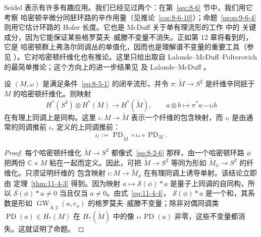 Seidel 表示有许多有趣应用。我们已经见过两个：在第~\ref{sec:8-6} 节中，我们用它考察
哈密顿辛微分同胚环路的辛作用量（见推论~\ref{cor:8-6-10}）；命题~\ref{prop:9-6-4}
则用它估计环路的 Hofer 长度。它也是 McDuff 关于单有理流形的工作  中的
关键成分，因为它能保证某些格罗莫夫--威滕不变量不消失。正如第 12 章将看到的，它是
哈密顿群上弗洛尔同调丛的单值化，因而也是理解谱不变量的重要工具（参见
）。它对哈密顿纤维化也有推论。这里只给出取自
Lalonde--McDuff--Polterovich  的最简单推论；这个方向上的进一步结果见
 及 Lalonde--McDuff 。

\begin{proposition}\label{prop:11-4-5}
设 $(M,\omega)$ 是满足条件~\eqref{eq:8-5-1} 的闭辛流形，并令
$\pi:\widetilde M\to S^2$ 是纤维辛同胚于 $M$ 的哈密顿纤维化。则映射
\[
  H^*(S^2)\otimes H^*(M)\longrightarrow H^*(\widetilde M),
  \qquad a\otimes b\longmapsto\pi^*a\smile\iota_!b
\]
在有理上同调上是同构。这里 $\iota:M\to\widetilde M$ 表示一个纤维的包含映射，而
$\iota_!$ 是由通常的同调推前 $\iota_*$ 定义的上同调推前：
\[
  \iota_!:=\operatorname{PD}_{\widetilde M}\circ\iota_*\circ\operatorname{PD}_M.
\]
\end{proposition}

\begin{proof}
每个哈密顿纤维化 $\widetilde M\to S^2$ 都像式~\eqref{eq:8-2-6} 那样，由一个哈密顿环路
$\phi$ 把两份 $\mathbb C\times M$ 粘在一起而定义。因此，可把
$\widetilde M\to S^2$ 等同为形如 $\widetilde M_\phi\to S^2$ 的纤维化。只须证明纤维的
包含映射 $\iota:M\to\widetilde M_\phi$ 在有理同调上诱导单射。该结论立即由
定理~\ref{thm:11-4-3} 得到。因为映射
$a\mapsto\mathcal S(\phi)*a$ 是量子上同调的自同构，所以
$\mathcal S(\phi)*a\ne0$ 当且仅当 $a\ne0$。由式~\eqref{eq:11-4-4}，
$\mathcal S(\phi)*a$ 是一个和，其系数是形如
$\operatorname{GW}_{\widetilde A,2}(a,e_\nu)$ 的格罗莫夫--威滕不变量；除非对偶同调类
$\operatorname{PD}(a)\in H_*(M)$ 在 $H_*(\widetilde M)$ 中的像
$\iota_*\operatorname{PD}(a)$ 非零，这些不变量都消失。这就证明了命题。
\end{proof}

